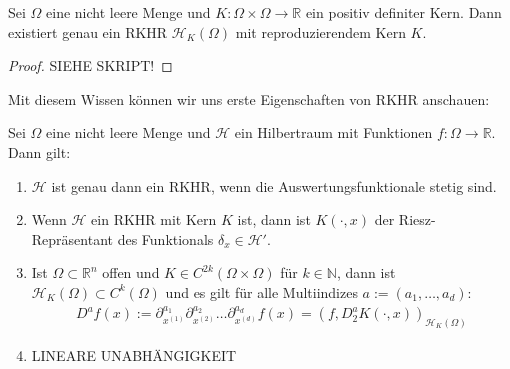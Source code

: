 \begin{theorem}
Sei $\Omega$ eine nicht leere Menge und $K:\Omega \times \Omega \rightarrow \mathbb{R}$ ein positiv definiter Kern. Dann existiert genau ein \ac{RKHR} $\mathcal{H}_K (\Omega)$ mit reproduzierendem Kern $K$.
\end{theorem}
\begin{proof}
SIEHE SKRIPT!
\end{proof}

Mit diesem Wissen können wir uns erste Eigenschaften von \ac{RKHR} anschauen:

\begin{theorem}
Sei $\Omega$ eine nicht leere Menge und $\mathcal{H}$ ein Hilbertraum mit Funktionen $f: \Omega \rightarrow \mathbb{R}$. Dann gilt:
\begin{enumerate}
\item $\mathcal{H}$ ist genau dann ein \ac{RKHR}, wenn die Auswertungsfunktionale stetig sind.
\item Wenn $\mathcal{H}$ ein \ac{RKHR} mit Kern $K$ ist, dann ist $K(\cdot,x)$ der Riesz-Repräsentant des Funktionals $\delta_x \in \mathcal{H}'$.
\item Ist $\Omega \subset \mathbb{R}^n$ offen und $K \in C^{2k}(\Omega \times \Omega)$ für $k \in \mathbb{N}$, dann ist $\mathcal{H}_K(\Omega) \subset C^k(\Omega)$ und es gilt für alle Multiindizes $a:= (a_1,\dots, a_d)$:
\begin{align*}
D^a f(x):= \partial_{x^{(1)}}^{a_1}\partial_{x^{(2)}}^{a_2} \dots \partial_{x^{(d)}}^{a_d} f(x) = (f, D_2^a K(\cdot,x))_{\mathcal{H}_K(\Omega)}
\end{align*}
\item LINEARE UNABHÄNGIGKEIT
\end{enumerate}
\end{theorem}

